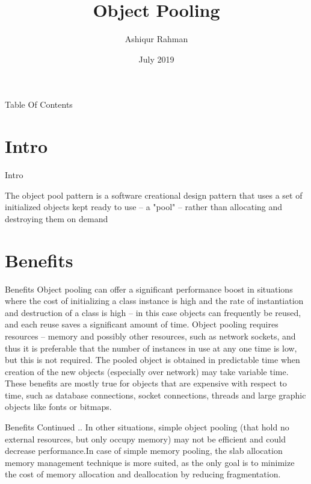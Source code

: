 \documentclass{beamer}
\title[Object Pooling]{Object Pooling}
\author{Ashiqur Rahman}
\date{July 2019}
\begin{document}
\maketitle

\begin{frame}{Table Of Contents}
	\centering
	\tableofcontents
\end{frame}

\section{Intro}
\begin{frame}{Intro}

	The object pool pattern is a software creational design pattern that uses a set of initialized objects kept ready to use – a "pool" – rather than allocating and destroying them on demand
	
\end{frame}

\section{Benefits}
\begin{frame}{Benefits}
	Object pooling can offer a significant performance boost in situations where the cost of initializing a class instance is high and the rate of instantiation and destruction of a class is high – in this case objects can frequently be reused, and each reuse saves a significant amount of time. Object pooling requires resources – memory and possibly other resources, such as network sockets, and thus it is preferable that the number of instances in use at any one time is low, but this is not required.
	The pooled object is obtained in predictable time when creation of the new objects (especially over network) may take variable time. These benefits are mostly true for objects that are expensive with respect to time, such as database connections, socket connections, threads and large graphic objects like fonts or bitmaps.
\end{frame}
	
\begin{frame}{Benefits Continued ..}
	In other situations, simple object pooling (that hold no external resources, but only occupy memory) may not be efficient and could decrease performance.In case of simple memory pooling, the slab allocation memory management technique is more suited, as the only goal is to minimize the cost of memory allocation and deallocation by reducing fragmentation.
\end{frame}
\end{document}
